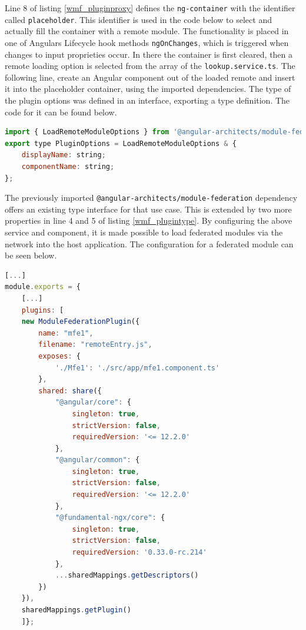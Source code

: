 Line 8 of listing \ref{wmf_pluginproxy} defines the \texttt{ng-container} with the identifier called \texttt{placeholder}. This identifier is used in the code below to select and actually fill the container with a remote module. The functionality is placed in one of Angulars Lifecycle hook methods \texttt{ngOnChanges}, which is triggered when changes to input proprieties occur.\cite{wmf_angular_lifecyclehooks} 
In there the container is first cleared, then a remote loading option is selected from the array of the \texttt{lookup.service.ts}. The following line, create an Angular component out of the loaded remote and insert it into the placeholder container, using the imported dependencies.
The type of the plugin options was defined in an interface, exporting a type definition. The code for it can be found below.
\newpage
\begin{lstlisting}[language=JavaScript, caption=Content of \texttt{plugin.ts} for remote module loading in shell applications, label=wmf_plugintype]
import { LoadRemoteModuleOptions } from '@angular-architects/module-federation';
export type PluginOptions = LoadRemoteModuleOptions & {
	displayName: string;
	componentName: string;
};
\end{lstlisting}

The previously imported \texttt{@angular-architects/module-federation} dependency offers an existing type interface for that use case. This is extended by two more properties in line 4 and 5 of listing \ref{wmf_plugintype}.
By configuring the above service and component, it is made possible to load federated modules via the network into the host application.
The configuration for a federated module can be seen below.

\begin{lstlisting}[language=JavaScript, caption=Content of \texttt{webpack.config.js} of the mfe1 remote app of the same versions WMF project, label=wmf_sameversions_mfe1]
[...]
module.exports = {
	[...]
	plugins: [
	new ModuleFederationPlugin({
		name: "mfe1",
		filename: "remoteEntry.js",
		exposes: {
			'./Mfe1': './src/app/mfe1.component.ts'
		},
		shared: share({
			"@angular/core": { 
				singleton: true, 
				strictVersion: false, 
				requiredVersion: '<= 12.2.0' 
			},
			"@angular/common": { 
				singleton: true, 
				strictVersion: false, 
				requiredVersion: '<= 12.2.0' 
			},
			"@fundamental-ngx/core": { 
				singleton: true, 
				strictVersion: false,
				requiredVersion: '0.33.0-rc.214' 
			},
			...sharedMappings.getDescriptors()
		})
	}),
	sharedMappings.getPlugin()
	]};
\end{lstlisting}

